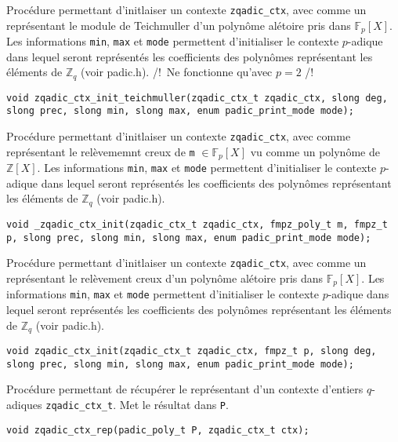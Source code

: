 \documentclass[11pt]{article}
\begin{document}
Procédure permettant d'initlaiser un contexte \texttt{zqadic_ctx}, avec comme un représentant le module de Teichmuller d'un polynôme alétoire pris dans $\mathbb{F}_p[X]$. Les informations \texttt{min}, \texttt{max} et \texttt{mode} permettent d'initialiser le contexte $p$-adique dans lequel seront représentés les coefficients des polynômes représentant les éléments de $\mathbb{Z}_q$ (voir padic.h). /!\ Ne fonctionne qu'avec $p = 2$ /!\ 
\begin{verbatim}
void zqadic_ctx_init_teichmuller(zqadic_ctx_t zqadic_ctx, slong deg, slong prec, slong min, slong max, enum padic_print_mode mode);
\end{verbatim}

Procédure permettant d'initlaiser un contexte \texttt{zqadic_ctx}, avec comme représentant le relèvememnt creux de \texttt{m} $\in \mathbb{F}_p[X]$ vu comme un polynôme de $\mathbb{Z}[X]$. Les informations \texttt{min}, \texttt{max} et \texttt{mode} permettent d'initialiser le contexte $p$-adique dans lequel seront représentés les coefficients des polynômes représentant les éléments de $\mathbb{Z}_q$ (voir padic.h). 
\begin{verbatim}
void _zqadic_ctx_init(zqadic_ctx_t zqadic_ctx, fmpz_poly_t m, fmpz_t p, slong prec, slong min, slong max, enum padic_print_mode mode);
\end{verbatim}

Procédure permettant d'initlaiser un contexte \texttt{zqadic_ctx}, avec comme un représentant le relèvement creux d'un polynôme alétoire pris dans $\mathbb{F}_p[X]$. Les informations \texttt{min}, \texttt{max} et \texttt{mode} permettent d'initialiser le contexte $p$-adique dans lequel seront représentés les coefficients des polynômes représentant les éléments de $\mathbb{Z}_q$ (voir padic.h). 
\begin{verbatim}
void zqadic_ctx_init(zqadic_ctx_t zqadic_ctx, fmpz_t p, slong deg, slong prec, slong min, slong max, enum padic_print_mode mode);
\end{verbatim}

Procédure permettant de récupérer le représentant d'un contexte d'entiers $q$-adiques \texttt{zqadic_ctx_t}. Met le résultat dans \texttt{P}. 
\begin{verbatim}
void zqadic_ctx_rep(padic_poly_t P, zqadic_ctx_t ctx);
\end{verbatim}
\end{document}

